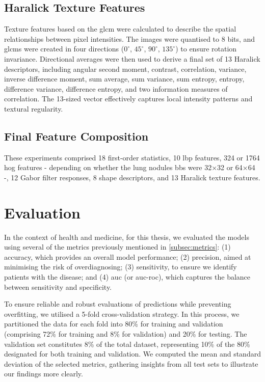 \subsection*{Haralick Texture Features}

Texture features based on the \ac{glcm} were calculated to describe the spatial relationships between pixel intensities. The images were quantised to 8 bits, and \ac{glcm}s were created in four directions ($0^\circ$, $45^\circ$, $90^\circ$, $135^\circ$) to ensure rotation invariance. Directional averages were then used to derive a final set of 13 Haralick descriptors, including angular second moment, contrast, correlation, variance, inverse difference moment, sum average, sum variance, sum entropy, entropy, difference variance, difference entropy, and two information measures of correlation. The 13-sized vector effectively captures local intensity patterns and textural regularity.

\subsection*{Final Feature Composition}

These experiments comprised 18 first-order statistics, 10 \ac{lbp} features, 324 or 1764 \ac{hog} features - depending on whether the lung nodules \acp{bb} were 32×32 or 64×64 -, 12 Gabor filter responses, 8 shape descriptors, and 13 Haralick texture features.


\section{Evaluation}
In the context of health and medicine, for this thesis, we evaluated the models using several of the metrics previously mentioned in \ref{subsec:metrics}: (1) accuracy, which provides an overall model performance; (2) precision, aimed at minimising the risk of overdiagnosing; (3) sensitivity, to ensure we identify patients with the disease; and (4) \ac{auc} (or \ac{auc-roc}), which captures the balance between sensitivity and specificity.

To ensure reliable and robust evaluations of predictions while preventing overfitting, we utilised a 5-fold cross-validation strategy.
In this process, we partitioned the data for each fold into 80\% for training and validation (comprising 72\% for training and 8\% for validation) and 20\% for testing. The validation set constitutes 8\% of the total dataset, representing 10\% of the 80\% designated for both training and validation.
We computed the mean and standard deviation of the selected metrics, gathering insights from all test sets to illustrate our findings more clearly.

